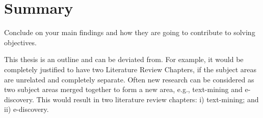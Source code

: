 \section{Summary}
Conclude on your main findings and how they are going to contribute to solving objectives.

This thesis is an outline and can be deviated from. For example, it would be completely justified to have two Literature Review Chapters, if the subject areas are unrelated and completely separate. Often new research can be considered as two subject areas merged together to form a new area, e.g., text-mining and e-discovery. This would result in two literature review chapters: i) text-mining; and ii) e-discovery. 


